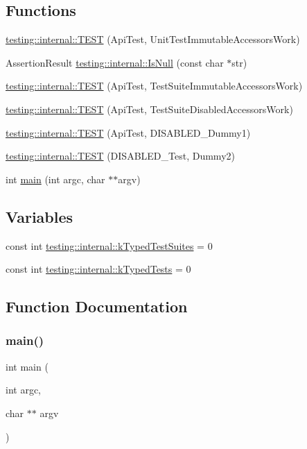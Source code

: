 \subsection*{Functions}
\begin{DoxyCompactItemize}
\item 
\mbox{\hyperlink{namespacetesting_1_1internal_a9ac879683abb06d1c0bba3a339ea2f40}{testing\+::internal\+::\+T\+E\+ST}} (Api\+Test, Unit\+Test\+Immutable\+Accessors\+Work)
\item 
Assertion\+Result \mbox{\hyperlink{namespacetesting_1_1internal_adcfd37a66bc4cb0e8291cf46e1a6c72b}{testing\+::internal\+::\+Is\+Null}} (const char $\ast$str)
\item 
\mbox{\hyperlink{namespacetesting_1_1internal_a1aef4ac7102e97f0941178e0ecf5c776}{testing\+::internal\+::\+T\+E\+ST}} (Api\+Test, Test\+Suite\+Immutable\+Accessors\+Work)
\item 
\mbox{\hyperlink{namespacetesting_1_1internal_a765c62c0b121a84326d39383273f7c91}{testing\+::internal\+::\+T\+E\+ST}} (Api\+Test, Test\+Suite\+Disabled\+Accessors\+Work)
\item 
\mbox{\hyperlink{namespacetesting_1_1internal_a9ed5f89c92532506899e3908e79af4de}{testing\+::internal\+::\+T\+E\+ST}} (Api\+Test, D\+I\+S\+A\+B\+L\+E\+D\+\_\+\+Dummy1)
\item 
\mbox{\hyperlink{namespacetesting_1_1internal_a4a84433419426d1c1b87ce998267b0d4}{testing\+::internal\+::\+T\+E\+ST}} (D\+I\+S\+A\+B\+L\+E\+D\+\_\+\+Test, Dummy2)
\item 
int \mbox{\hyperlink{googletest-master_2googletest_2test_2gtest-unittest-api__test_8cc_a3c04138a5bfe5d72780bb7e82a18e627}{main}} (int argc, char $\ast$$\ast$argv)
\end{DoxyCompactItemize}
\subsection*{Variables}
\begin{DoxyCompactItemize}
\item 
const int \mbox{\hyperlink{namespacetesting_1_1internal_a92b49076a2183a2796d2772315839f6a}{testing\+::internal\+::k\+Typed\+Test\+Suites}} = 0
\item 
const int \mbox{\hyperlink{namespacetesting_1_1internal_a53ee2d113744f9ba1d89469db4d7388b}{testing\+::internal\+::k\+Typed\+Tests}} = 0
\end{DoxyCompactItemize}


\subsection{Function Documentation}
\mbox{\label{googletest-master_2googletest_2test_2gtest-unittest-api__test_8cc_a3c04138a5bfe5d72780bb7e82a18e627}} 
\subsubsection{\texorpdfstring{main()}{main()}}
{\footnotesize\ttfamily int main (\begin{DoxyParamCaption}\item[{int}]{argc,  }\item[{char $\ast$$\ast$}]{argv }\end{DoxyParamCaption})}

